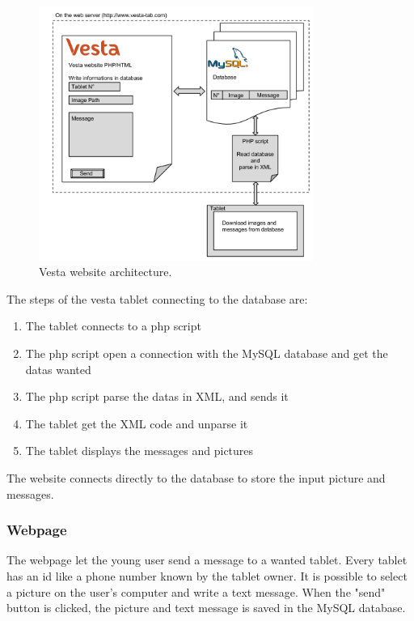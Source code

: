 \begin{figure}[!htb]
    \centering
    \includegraphics[width=0.8\textwidth,keepaspectratio]{chap/softFig/vesta_website2}
    \caption{Vesta website architecture.}
    \label{fig:web archi}
\end{figure}

The steps of the vesta tablet connecting to the database are:
\begin{enumerate}
\item{The tablet connects to a php script}
\item{The php script open a connection with the MySQL database and get the datas wanted}
\item{The php script parse the datas in XML, and sends it}
\item{The tablet get the XML code and unparse it}
\item{The tablet displays the messages and pictures}
\end{enumerate}

The website connects directly to the database to store the input picture and messages.

\clearpage

\subsubsection{Webpage}
The webpage let the young user send a message to a wanted tablet. Every tablet has an id like a phone number known by the tablet owner. It is possible to select a picture on the user's computer and write a text message. When the "send" button is clicked, the picture and text message is saved in the MySQL database.

